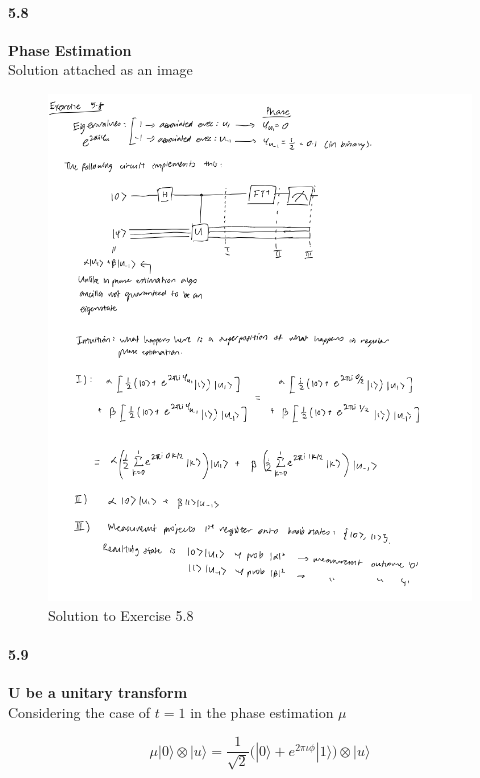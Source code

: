 \paragraph{5.8} \textbf{Phase Estimation}
\\Solution attached as an image
\begin{figure}[h!]
    \centering
    \includegraphics[width = \linewidth]{Chapter 5/Ex 5.8 soln.png}
    \caption{Solution to Exercise 5.8}
    \label{fig:my_label}
\end{figure}



\paragraph{5.9} \textbf{U be a unitary transform}
\\

Considering the case of $t=1$ in the phase estimation $\mu$

$$ \mu |0\rangle \otimes |u\rangle = \frac{1}{\sqrt{2}} \bigg( |0\rangle + e^{2 \pi \iota \phi} |1\rangle \bigg) \otimes |u\rangle$$

